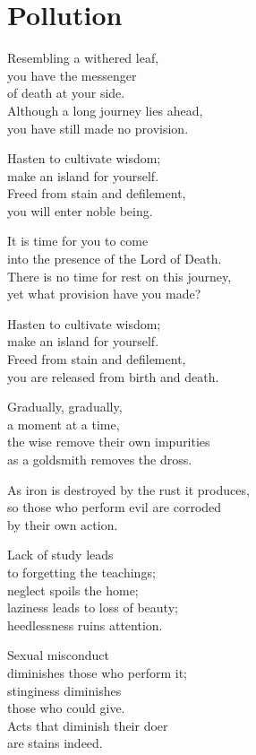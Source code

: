 
\chapter{Pollution}


Resembling a withered leaf,\\
you have the messenger\\
of death at your side.\\
Although a long journey lies ahead,\\
you have still made no provision.


Hasten to cultivate wisdom;\\
make an island for yourself.\\
Freed from stain and defilement,\\
you will enter noble being.


It is time for you to come\\
into the presence of the Lord of Death.\\
There is no time for rest on this journey,\\
yet what provision have you made?


Hasten to cultivate wisdom;\\
make an island for yourself.\\
Freed from stain and defilement,\\
you are released from birth and death.


Gradually, gradually,\\
a moment at a time,\\
the wise remove their own impurities\\
as a goldsmith removes the dross.


As iron is destroyed by the rust it produces,\\
so those who perform evil are corroded\\
by their own action.


Lack of study leads\\
to forgetting the teachings;\\
neglect spoils the home;\\
laziness leads to loss of beauty;\\
heedlessness ruins attention.


Sexual misconduct\\
diminishes those who perform it;\\
stinginess diminishes\\
those who could give.\\
Acts that diminish their doer\\
are stains indeed.



